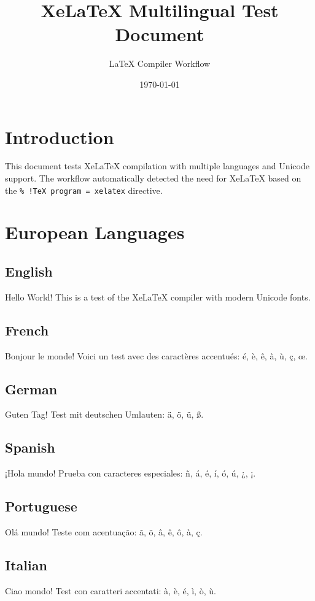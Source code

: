 \documentclass[12pt,a4paper]{article}
\title{XeLaTeX Multilingual Test Document}
\author{LaTeX Compiler Workflow}
\date{\today}
\begin{document}
\maketitle

\section{Introduction}

This document tests XeLaTeX compilation with multiple languages and Unicode support. The workflow automatically detected the need for XeLaTeX based on the \texttt{\% !TeX program = xelatex} directive.

\section{European Languages}

\subsection{English}
Hello World! This is a test of the XeLaTeX compiler with modern Unicode fonts.

\subsection{French}
Bonjour le monde! Voici un test avec des caractères accentués: é, è, ê, à, ù, ç, œ.

\subsection{German}
Guten Tag! Test mit deutschen Umlauten: ä, ö, ü, ß.

\subsection{Spanish}
¡Hola mundo! Prueba con caracteres especiales: ñ, á, é, í, ó, ú, ¿, ¡.

\subsection{Portuguese}
Olá mundo! Teste com acentuação: ã, õ, â, ê, ô, à, ç.

\subsection{Italian}
Ciao mondo! Test con caratteri accentati: à, è, é, ì, ò, ù.
\end{document}

